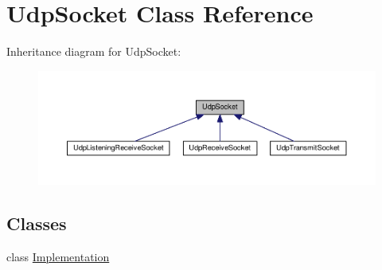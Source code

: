 \hypertarget{class_udp_socket}{}\section{Udp\+Socket Class Reference}
\label{class_udp_socket}


Inheritance diagram for Udp\+Socket\+:\nopagebreak
\begin{figure}[H]
\begin{center}
\leavevmode
\includegraphics[width=350pt]{class_udp_socket__inherit__graph}
\end{center}
\end{figure}
\subsection*{Classes}
\begin{DoxyCompactItemize}
\item 
class \hyperlink{class_udp_socket_1_1_implementation}{Implementation}
\end{DoxyCompactItemize}
